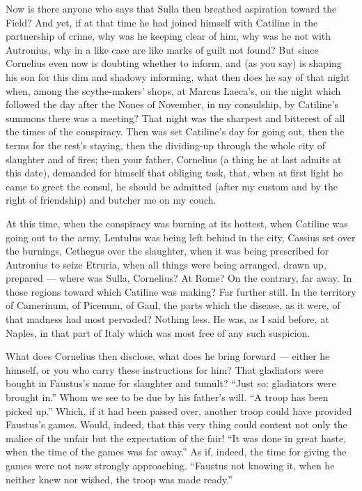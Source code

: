  Now is there anyone who says that Sulla then breathed aspiration toward the Field? And yet, if at that time he had joined himself with Catiline in the partnership of crime, why was he keeping clear of him, why was he not with Autronius, why in a like case are like marks of guilt not found? But since Cornelius even now is doubting whether to inform, and (as you say) is shaping his son for this dim and shadowy informing, what then does he say of that night when, among the scythe-makers' shops, at Marcus Laeca's, on the night which followed the day after the Nones of November, in my consulship, by Catiline's summons there was a meeting? That night was the sharpest and bitterest of all the times of the conspiracy. Then was set Catiline's day for going out, then the terms for the rest's staying, then the dividing-up through the whole city of slaughter and of fires; then your father, Cornelius (a thing he at last admits at this date), demanded for himself that obliging task, that, when at first light he came to greet the consul, he should be admitted (after my custom and by the right of friendship) and butcher me on my couch.

 At this time, when the conspiracy was burning at its hottest, when Catiline was going out to the army, Lentulus was being left behind in the city, Cassius set over the burnings, Cethegus over the slaughter, when it was being prescribed for Autronius to seize Etruria, when all things were being arranged, drawn up, prepared --- where was Sulla, Cornelius? At Rome? On the contrary, far away. In those regions toward which Catiline was making? Far further still. In the territory of Camerinum, of Picenum, of Gaul, the parts which the disease, as it were, of that madness had most pervaded? Nothing less. He was, as I said before, at Naples, in that part of Italy which was most free of any such suspicion.

 What does Cornelius then disclose, what does he bring forward --- either he himself, or you who carry these instructions for him? That gladiators were bought in Faustus's name for slaughter and tumult? ``Just so: gladiators were brought in.'' Whom we see to be due by his father's will. ``A troop has been picked up.'' Which, if it had been passed over, another troop could have provided Faustus's games. Would, indeed, that this very thing could content not only the malice of the unfair but the expectation of the fair! ``It was done in great haste, when the time of the games was far away.'' As if, indeed, the time for giving the games were not now strongly approaching. ``Faustus not knowing it, when he neither knew nor wished, the troop was made ready.''

